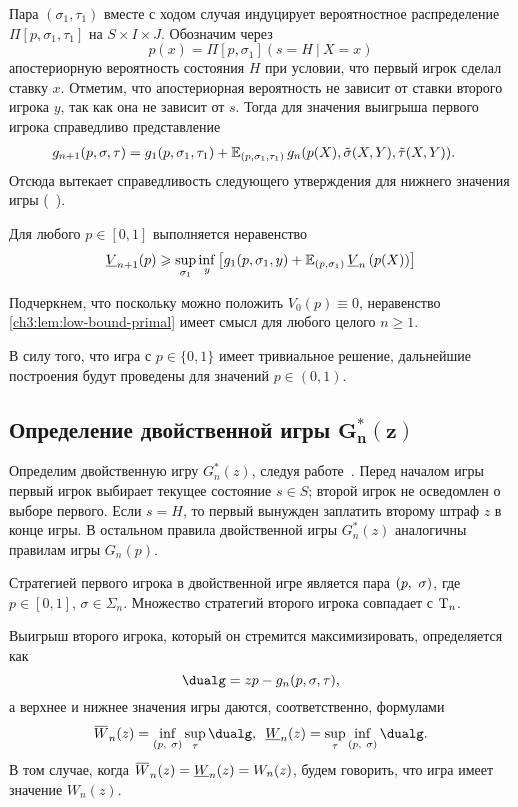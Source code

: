 {Пара $(\sigma_1, \tau_1)$ вместе с ходом случая индуцирует вероятностное распределение $\Pi[p, \sigma_1, \tau_1]$ на $S \times I \times J$.
Обозначим через
\[
  p(x) = \Pi[p, \sigma_1](s = H\ |\ X = x)
\]
апостериорную вероятность состояния $H$ при условии, что первый игрок сделал ставку $x$.
Отметим, что апостериорная вероятность не зависит от ставки второго игрока $y$, так как она не зависит от $s$.
Тогда для значения выигрыша первого игрока справедливо представление
\begin{align*}
  g_{n+1}(p, \sigma, \tau) 
  &= 
    g_1(p, \sigma_1, \tau_1) +
    \operatorname{\mathbb{E}}_{( p, \sigma_1, \tau_1 )}
    g_n(p(X), \tilde{\sigma}(X, Y), \tilde{\tau}(X, Y)).
\end{align*}
Отсюда вытекает справедливость следующего утверждения для нижнего значения игры (\seename~\cite{demeyer02}).
\begin{lemma}
  \label{ch3:lem:low-bound-primal}
  Для любого $p \in [0, 1]$ выполняется неравенство
  \begin{equation}
    \LV{n+1}(p) \geqslant \sup_{\sigma_1} \inf_{y} \left[
      g_1(p, \sigma_1, y)
    + \E_{( p, \sigma_1 )} \LV{n}\left( p(X) \right)
    \right]
  \end{equation}
\end{lemma}
Подчеркнем, что поскольку можно положить $V_0(p) \equiv 0$, неравенство \eqref{ch3:lem:low-bound-primal} имеет смысл для любого целого $n \geqslant 1$.

В силу того, что игра с $p \in \{0, 1\}$ имеет тривиальное решение, дальнейшие построения будут проведены для значений $p \in (0, 1)$.

\subsection{Определение двойственной игры $\mathbf{ G^{*}_{n}(z) }$}
Определим двойственную игру $G^*_n(z)$, следуя работе~\cite{demeyer02}.
Перед началом игры первый игрок выбирает текущее состояние $s \in S$; второй игрок не осведомлен о выборе первого.
Если $s = H$, то первый вынужден заплатить второму штраф $z$ в конце игры.
В остальном правила двойственной игры $G^*_n(z)$ аналогичны правилам игры $G_n(p)$.

Стратегией первого игрока в двойственной игре является пара $(p,\ \sigma)$, где $p \in [0, 1]$, $\sigma \in \Sigma_n$.
Множество стратегий второго игрока совпадает с $\mathrm{T}_n$.

Выигрыш второго игрока, который он стремится максимизировать, определяется как
\begin{equation*}
  \dualg = z p - g_n(p, \sigma, \tau),
\end{equation*}
а верхнее и нижнее значения игры даются, соответственно, формулами
\begin{equation*}
  \HW{n}(z) = \inf_{\dualFPS} \sup_\tau \dualg, \enskip
  \LW{n}(z) = \sup_\tau \inf_{\dualFPS} \dualg.
\end{equation*}
В том случае, когда $\HW{n}(z) = \LW{n}(z) = W_n(z)$, будем говорить, что игра имеет значение $W_n(z)$.

}
